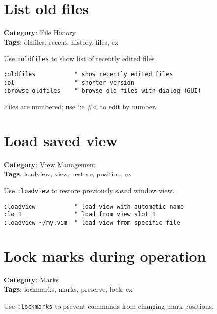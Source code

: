 {{{{{\section{List old files}

\textbf{Category}: File History\\ \textbf{Tags}: oldfiles, recent, history, files, ex
\vspace{0.5cm}

Use {\footnotesize \Verb§:oldfiles§} to show list of recently edited files.

\begin{Exa*}{}
\begin{Verbatim}[fontsize=\footnotesize, breaklines, breakanywhere]
:oldfiles           " show recently edited files
:ol                 " shorter version
:browse oldfiles    " browse old files with dialog (GUI)
\end{Verbatim}
\end{Exa*}

Files are numbered; use `:e \#< to edit by number.

\section{Load saved view}

\textbf{Category}: View Management\\ \textbf{Tags}: loadview, view, restore, position, ex
\vspace{0.5cm}

Use {\footnotesize \Verb§:loadview§} to restore previously saved window view.

\begin{Exa*}{}
\begin{Verbatim}[fontsize=\footnotesize, breaklines, breakanywhere]
:loadview           " load view with automatic name
:lo 1               " load from view slot 1
:loadview ~/my.vim  " load view from specific file
\end{Verbatim}
\end{Exa*}

\section{Lock marks during operation}

\textbf{Category}: Marks\\ \textbf{Tags}: lockmarks, marks, preserve, lock, ex
\vspace{0.5cm}

Use {\footnotesize \Verb§:lockmarks§} to prevent commands from changing mark positions.

}}}}}
